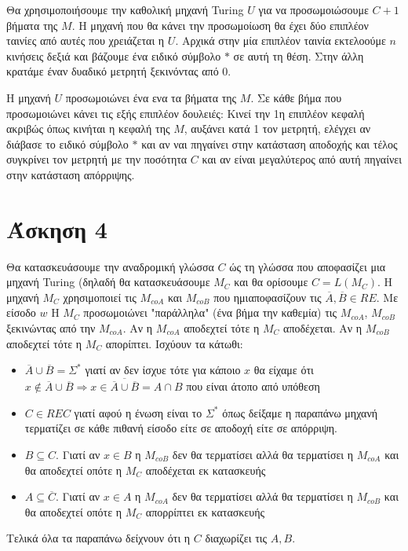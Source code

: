 \documentclass[11pt]{article}
\begin{document}
Θα χρησιμοποιήσουμε την καθολική μηχανή Turing $U$ για να προσωμοιώσουμε $C+1$ βήματα της $M$. 
Η μηχανή που θα κάνει την προσωμοίωση θα έχει δύο επιπλέον ταινίες από αυτές που χρειάζεται 
η $U$. Αρχικά στην μία επιπλέον ταινία εκτελοούμε $n$ κινήσεις δεξιά και βάζουμε ένα ειδικό 
σύμβολο $*$ σε αυτή τη θέση. Στην άλλη κρατάμε έναν δυαδικό μετρητή ξεκινόντας από $0$. 

Η μηχανή $U$ προσωμοιώνει ένα ενα τα βήματα της $Μ$. Σε κάθε βήμα που προσωμοιώνει κάνει τις εξής
επιπλέον δουλειές: Κινεί την 1η επιπλέον κεφαλή ακριβώς όπως κινήται η κεφαλή της $M$, αυξάνει 
κατά 1 τον μετρητή, ελέγχει αν διάβασε το ειδικό σύμβολο $*$ και αν ναι πηγαίνει στην κατάσταση αποδοχής 
και τέλος συγκρίνει τον μετρητή με την ποσότητα $C$ και αν είναι μεγαλύτερος από αυτή πηγαίνει 
στην κατάσταση απόρριψης.
                                                              




\section*{Άσκηση 4}
Θα κατασκευάσουμε την αναδρομική γλώσσα $C$ ώς τη γλώσσα που αποφασίζει μια μηχανή Turing 
(δηλαδή θα κατασκευάσουμε $M_C$ και θα ορίσουμε $C=L(M_C)$. Η μηχανή $M_C$
χρησιμοποιεί τις $M_{coA}$ και $M_{coB}$ που ημιαποφασίζουν τις $\overline{A},\overline{B}\in RE$.
Με είσοδο $w$ H $M_C$ προσωμοιώνει "παράλληλα" (ένα βήμα την καθεμία) τις $M_{coA}$, $M_{coB}$
ξεκινώντας από την $M_{coA}$. Αν η $M_{coA}$ αποδεχτεί τότε η $M_C$ αποδέχεται. Αν η $M_{coB}$ αποδεχτεί
τότε η $M_C$ απορίπτει. Ισχύουν τα κάτωθι:
\begin{itemize}
  \item  $\overline{A}\cup \overline{B} = \Sigma^*$ γιατί αν δεν ίσχυε τότε για κάποιο $x$ θα είχαμε ότι
    $x\notin\overline{A}\cup \overline{B} \Rightarrow x\in\overline{\overline{A}\cup \overline{B}}=A\cap B$
    που είναι άτοπο από υπόθεση
  \item $C\in REC$ γιατί αφού η ένωση είναι το $\Sigma^*$ όπως δείξαμε η παραπάνω μηχανή τερματίζει σε 
    κάθε πιθανή είσοδο είτε σε αποδοχή είτε σε απόρριψη.
  \item $B\subseteq C$. Γιατί αν $x\in B$ η $M_{coB}$ δεν θα τερματίσει αλλά θα τερματίσει η  
    $M_{coA}$ και θα αποδεχτεί οπότε η $M_C$ αποδέχεται εκ κατασκευής
  \item $A\subseteq \overline{C}$. Γιατί αν $x\in A$ η $M_{coA}$ δεν θα τερματίσει αλλά θα τερματίσει η  
    $M_{coB}$ και θα αποδεχτεί οπότε η $M_C$ απορρίπτει εκ κατασκευής
\end{itemize}
Τελικά όλα τα παραπάνω δείχνουν ότι η $C$ διαχωρίζει τις $A,B$.
\end{document}
